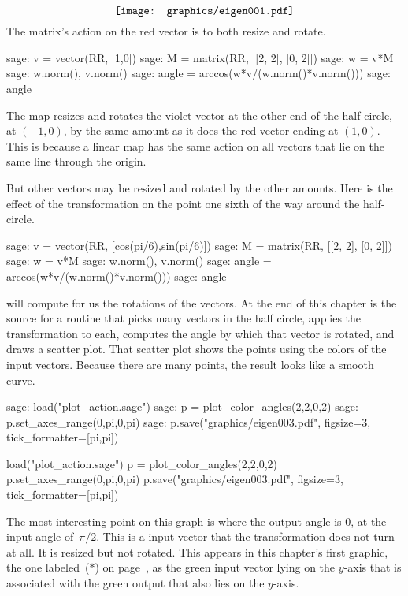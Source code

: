\begin{equation*}
  \vcenteredhbox{\texttt{[image: graphics/eigen001.pdf]}}
\end{equation*}
The matrix's action on the red vector is to both resize and rotate.
\begin{sagecommandline}
sage: v = vector(RR, [1,0])
sage: M = matrix(RR, [[2, 2], [0, 2]])
sage: w = v*M
sage: w.norm(), v.norm() 
sage: angle = arccos(w*v/(w.norm()*v.norm())) 
sage: angle 
\end{sagecommandline}
\noindent The map resizes and rotates the violet vector at the other end of the 
half circle, at $(-1,0)$, by the
same amount as it does the red vector ending at $(1,0)$. 
This is because a linear map has the same action on 
all vectors that lie on the same line through the origin.

But other vectors may be resized and rotated by the other
amounts.
Here is the effect of the transformation on the point
one sixth of the way around the half-circle.
\begin{sagecommandline}
sage: v = vector(RR, [cos(pi/6),sin(pi/6)])
sage: M = matrix(RR, [[2, 2], [0, 2]])
sage: w = v*M
sage: w.norm(), v.norm() 
sage: angle = arccos(w*v/(w.norm()*v.norm())) 
sage: angle 
\end{sagecommandline}

\Sage{} will compute for us the rotations of the vectors.
At the end of this chapter is the source for a routine 
 that
picks many vectors in the 
half circle, applies the transformation to each, 
computes the angle by which that
vector is rotated, and draws a scatter plot. 
That scatter plot shows the points using
the colors of the input vectors.
Because there are many points, the result looks like a smooth curve.
\begin{sagecommandline}
sage: load("plot_action.sage")  
sage: p = plot_color_angles(2,2,0,2)
sage: p.set_axes_range(0,pi,0,pi)
sage: p.save("graphics/eigen003.pdf", figsize=3, tick_formatter=[pi,pi])
\end{sagecommandline}
\begin{sagesilent}
load("plot_action.sage")  
p = plot_color_angles(2,2,0,2)
p.set_axes_range(0,pi,0,pi)
p.save("graphics/eigen003.pdf", figsize=3, tick_formatter=[pi,pi])
\end{sagesilent}
\begin{center}
\end{center}
The most interesting point on this graph is where the output angle is $0$,
at the input angle of~$\pi/2$.
This is a input vector that the transformation does not turn at all. 
It is resized but not rotated.
This appears in this chapter's first graphic, the one labeled~($*$)
on page~\pageref{gr:firstgraphic}, 
as the green input vector lying on the $y$-axis
that is associated with the green output that also lies on the $y$-axis.





